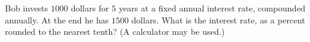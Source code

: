 Bob invests $1000$ dollars for $5$ years at a fixed annual interest rate, compounded annually. At the end he has $1500$ dollars. What is the interest rate, as a percent rounded to the nearest tenth? (A calculator may be used.)

